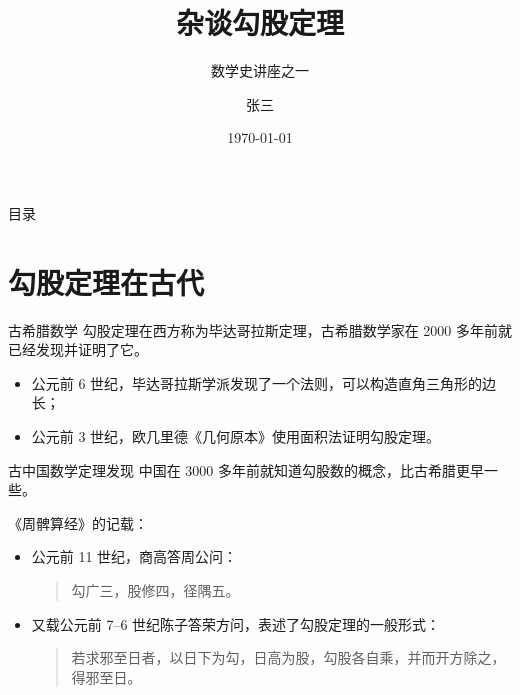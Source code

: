 \documentclass[xcolor=table]{beamer}
\title{杂谈勾股定理}
\subtitle{数学史讲座之一}
\institute{九章学堂}
\author{张三}
\date{\today}
\begin{document}
\begin{frame}
\titlepage
\end{frame}

\begin{frame}{目录}
\tableofcontents
\end{frame}

\section{勾股定理在古代}

\begin{frame}{古希腊数学}
勾股定理在西方称为毕达哥拉斯定理，古希腊数学家在 2000 多年前就已经发现并证明了它\cite{Kline}。
\begin{itemize}
\item 公元前 6 世纪，毕达哥拉斯学派发现了一个法则，可以构造直角三角形的边长；
\item 公元前 3 世纪，欧几里德《几何原本》使用面积法证明勾股定理。
\end{itemize}
\end{frame}

\begin{frame}{古中国数学}{定理发现}
中国在 3000 多年前就知道勾股数的概念，比古希腊更早一些。

《周髀算经》的记载：
\begin{itemize}
\item 公元前 11 世纪，商高答周公问：
\begin{quote}
勾广三，股修四，径隅五。
\end{quote}
\item 又载公元前 7--6 世纪陈子答荣方问，表述了勾股定理的一般形式：
\begin{quote}
若求邪至日者，以日下为勾，日高为股，勾股各自乘，并而开方除之，得邪至日。
\end{quote}
\end{itemize}
\end{frame}
\end{document}
